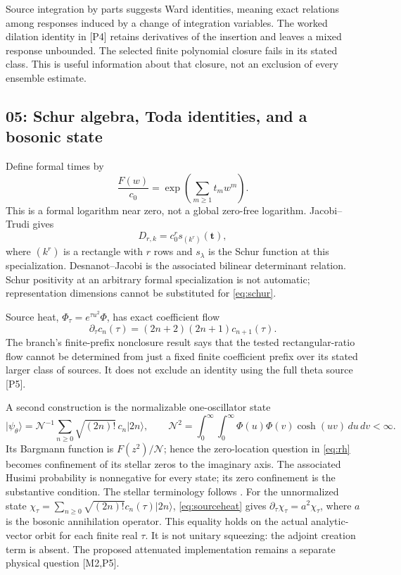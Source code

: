 \documentclass[11pt,letterpaper]{article}
\numberwithin{equation}{section}
\theoremstyle{remark}
\newcommand{\dd}{\,d}
\newcommand{\evid}[1]{\textsf{[#1]}}
\newcommand{\ket}[1]{\lvert #1\rangle}
\begin{document}
Source integration by parts suggests Ward identities, meaning exact
relations among responses induced by a change of integration variables.
The worked dilation identity in \evid{P4} retains derivatives of the
insertion and leaves a mixed response unbounded. The selected finite
polynomial closure fails in its stated class. This is useful information
about that closure, not an exclusion of every ensemble estimate.

\subsection{05: Schur algebra, Toda identities, and a bosonic state}

Define formal times by
\begin{equation}
 \frac{F(w)}{c_0}=\exp\left(\sum_{m\ge1}t_mw^m\right).
\end{equation}
This is a formal logarithm near zero, not a global zero-free logarithm.
Jacobi--Trudi gives
\begin{equation}
 D_{r,k}=c_0^r s_{(k^r)}(\mathbf t), \label{eq:schur}
\end{equation}
where $(k^r)$ is a rectangle with $r$ rows and $s_\lambda$ is the
Schur function at this specialization. Desnanot--Jacobi is the
associated bilinear determinant relation. Schur positivity at an
arbitrary formal specialization is not automatic; representation
dimensions cannot be substituted for \eqref{eq:schur}.

Source heat, $\Phi_\tau=e^{\tau u^2}\Phi$, has exact coefficient flow
\begin{equation}
 \partial_\tau c_n(\tau)=(2n+2)(2n+1)c_{n+1}(\tau).
 \label{eq:sourceheat}
\end{equation}
The branch's finite-prefix nonclosure result says that the tested
rectangular-ratio flow cannot be determined from just a fixed finite
coefficient prefix over its stated larger class of sources. It does
not exclude an identity using the full theta source \evid{P5}.

A second construction is the normalizable one-oscillator state
\begin{equation}
 \ket{\psi_\theta}=\mathcal N^{-1}
       \sum_{n\ge0}\sqrt{(2n)!}\,c_n\ket{2n},\qquad
 \mathcal N^2=\int_0^\infty\!\int_0^\infty
                 \Phi(u)\Phi(v)\cosh(uv)\dd u\dd v<\infty.
\end{equation}
Its Bargmann function is $F(z^2)/\mathcal N$; hence the zero-location
question in \eqref{eq:rh} becomes confinement of its stellar zeros to
the imaginary axis. The associated Husimi probability is nonnegative
for every state; its zero confinement is the substantive condition.
The stellar terminology follows \cite{ChabaudMarkhamGrosshans2020}.
For the unnormalized state
$\chi_\tau=\sum_{n\ge0}\sqrt{(2n)!}c_n(\tau)\ket{2n}$,
\eqref{eq:sourceheat} gives $\partial_\tau\chi_\tau=a^2\chi_\tau$,
where $a$ is the bosonic annihilation operator. This equality holds on
the actual analytic-vector orbit for each finite real $\tau$. It is not unitary squeezing:
the adjoint creation term is absent. The proposed attenuated
implementation remains a separate physical question \evid{M2,P5}.
\end{document}
